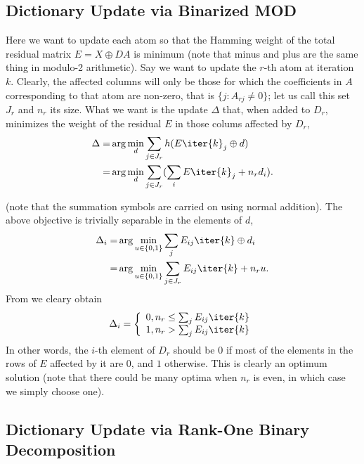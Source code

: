 \documentclass[a4paper]{IEEEtran}
\begin{document}
\subsection{Dictionary Update via Binarized MOD}
 
Here we want to update each atom so that the Hamming weight of the total residual matrix $E = X \oplus DA$ is minimum (note that minus and plus are the same thing in modulo-2 arithmetic). Say we want to update the $r$-th atom at iteration $k$. Clearly, the affected columns will only be those for which the  coefficients in $A$  corresponding to that atom are non-zero, that is $\{j : A_{rj} \neq 0 \}$; let us call this set $J_r$ and $n_r$ its size. What we want is the update $\Delta$ that, when added to $D_r$, minimizes the weight of the residual $E$ in those colums affected by $D_r$,
 \begin{eqnarray}
 \Delta  =& \arg\min_d \sum_{j \in J_r}  h(E\iter{k}_j \oplus d) \\
 =& \arg\min_d \sum_{j \in J_r} (\sum_i E\iter{k}_j + n_r d_i).
\label{eq:bdu2}
 \end{eqnarray}

(note that the summation symbols are carried on using normal addition). The above objective is trivially separable in the elements of $d$,
 \begin{eqnarray}
 \Delta_i  =& \arg\min_{u \in \{0,1\}} \sum_j E_{ij}\iter{k} \oplus d_i\\
 =& \arg\min_{u \in \{0,1\}} \sum_{j\in J_r} E_{ij}\iter{k} + n_r u.
\label{eq:bdu3}
 \end{eqnarray}
From  we cleary obtain 
\begin{equation}
\Delta_i = \left\{
\begin{array}{cl}
0, n_r \leq  \sum_j E_{ij}\iter{k} \\
1, n_r > \sum_j E_{ij}\iter{k}
\end{array}
\right. 
\label{eq:bdu4}
\end{equation}
In other words, the $i$-th element of $D_r$ should be $0$ if most of the elements in the rows of $E$ affected by it are $0$, and $1$ otherwise. 
This is clearly an optimum solution (note that there could be many optima  when $n_r$ is even, in which case we simply choose one).

\subsection{Dictionary Update via Rank-One Binary Decomposition}
\end{document}
